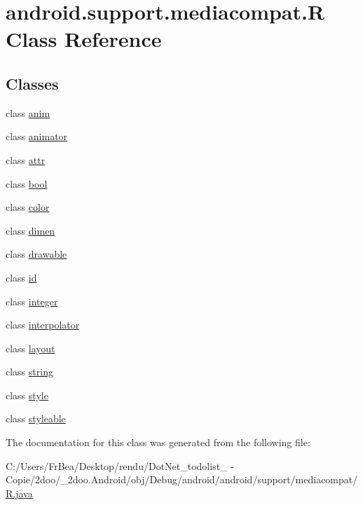 \hypertarget{classandroid_1_1support_1_1mediacompat_1_1_r}{
\section{android.support.mediacompat.R Class Reference}
\label{classandroid_1_1support_1_1mediacompat_1_1_r}
}
\subsection*{Classes}
\begin{CompactItemize}
\item 
class \hyperlink{classandroid_1_1support_1_1mediacompat_1_1_r_1_1anim}{anim}
\item 
class \hyperlink{classandroid_1_1support_1_1mediacompat_1_1_r_1_1animator}{animator}
\item 
class \hyperlink{classandroid_1_1support_1_1mediacompat_1_1_r_1_1attr}{attr}
\item 
class \hyperlink{classandroid_1_1support_1_1mediacompat_1_1_r_1_1bool}{bool}
\item 
class \hyperlink{classandroid_1_1support_1_1mediacompat_1_1_r_1_1color}{color}
\item 
class \hyperlink{classandroid_1_1support_1_1mediacompat_1_1_r_1_1dimen}{dimen}
\item 
class \hyperlink{classandroid_1_1support_1_1mediacompat_1_1_r_1_1drawable}{drawable}
\item 
class \hyperlink{classandroid_1_1support_1_1mediacompat_1_1_r_1_1id}{id}
\item 
class \hyperlink{classandroid_1_1support_1_1mediacompat_1_1_r_1_1integer}{integer}
\item 
class \hyperlink{classandroid_1_1support_1_1mediacompat_1_1_r_1_1interpolator}{interpolator}
\item 
class \hyperlink{classandroid_1_1support_1_1mediacompat_1_1_r_1_1layout}{layout}
\item 
class \hyperlink{classandroid_1_1support_1_1mediacompat_1_1_r_1_1string}{string}
\item 
class \hyperlink{classandroid_1_1support_1_1mediacompat_1_1_r_1_1style}{style}
\item 
class \hyperlink{classandroid_1_1support_1_1mediacompat_1_1_r_1_1styleable}{styleable}
\end{CompactItemize}


The documentation for this class was generated from the following file:\begin{CompactItemize}
\item 
C:/Users/FrBea/Desktop/rendu/DotNet\_\-todolist\_ - Copie/2doo/\_\-2doo.Android/obj/Debug/android/android/support/mediacompat/\hyperlink{android_2support_2mediacompat_2_r_8java}{R.java}\end{CompactItemize}
